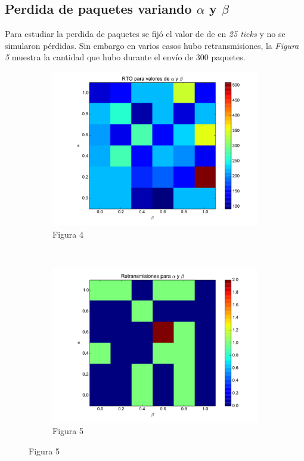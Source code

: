     \subsection{Perdida de paquetes variando $\alpha$ y $\beta$}
        Para estudiar la perdida de paquetes se fij\'o el valor de
        de \rto{} en \textit{25 ticks} y no se simularon p\'erdidas.
        Sin embargo en varios casos hubo retransmisiones, la 
        \textit{Figura 5} muestra la cantidad que hubo durante el env\'io de 300
		paquetes.        
    \begin{figure}[H]
	    \center
	    \begin{subfigure}{0.45\textwidth}
		    \includegraphics[width=1.0\textwidth]{imagenes/rto_vs_alphaBeta.pdf}
		    \caption*{Figura 4}
	    \end{subfigure}
	    ~
	    \begin{subfigure}{0.45\textwidth}
		    \includegraphics[width=1.0\textwidth]{imagenes/retransmisiones_300.pdf}
		    \caption*{Figura 5}
	    \end{subfigure}
    \end{figure}

